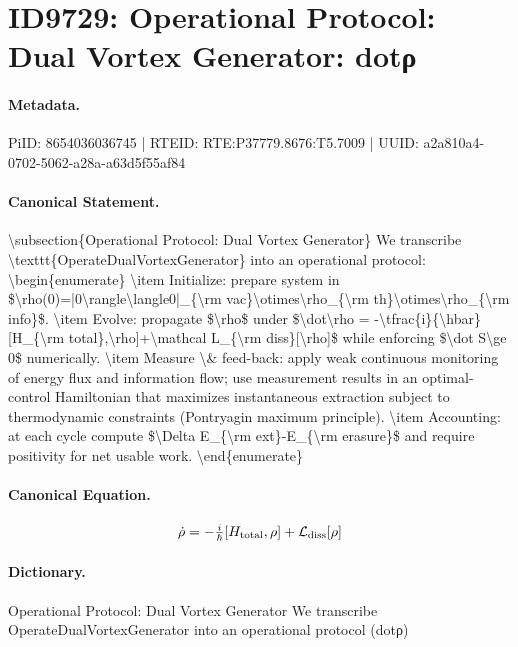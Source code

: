 \section*{ID9729: Operational Protocol: Dual Vortex Generator: dotρ}
\paragraph{Metadata.}
PiID: 8654036036745 | RTEID: RTE:P37779.8676:T5.7009 | UUID: a2a810a4-0702-5062-a28a-a63d5f55af84

\paragraph{Canonical Statement.}
\textbackslash{}subsection\{Operational Protocol: Dual Vortex Generator\} We transcribe \textbackslash{}texttt\{OperateDualVortexGenerator\} into an operational protocol: \textbackslash{}begin\{enumerate\} \textbackslash{}item Initialize: prepare system in \$\textbackslash{}rho(0)=|0\textbackslash{}rangle\textbackslash{}langle0|\_\{\textbackslash{}rm vac\}\textbackslash{}otimes\textbackslash{}rho\_\{\textbackslash{}rm th\}\textbackslash{}otimes\textbackslash{}rho\_\{\textbackslash{}rm info\}\$. \textbackslash{}item Evolve: propagate \$\textbackslash{}rho\$ under \$\textbackslash{}dot\textbackslash{}rho = -\textbackslash{}tfrac\{i\}\{\textbackslash{}hbar\}[H\_\{\textbackslash{}rm total\},\textbackslash{}rho]+\textbackslash{}mathcal L\_\{\textbackslash{}rm diss\}[\textbackslash{}rho]\$ while enforcing \$\textbackslash{}dot S\textbackslash{}ge 0\$ numerically. \textbackslash{}item Measure \textbackslash{}\& feed-back: apply weak continuous monitoring of energy flux and information flow; use measurement results in an optimal-control Hamiltonian that maximizes instantaneous extraction subject to thermodynamic constraints (Pontryagin maximum principle). \textbackslash{}item Accounting: at each cycle compute \$\textbackslash{}Delta E\_\{\textbackslash{}rm ext\}-E\_\{\textbackslash{}rm erasure\}\$ and require positivity for net usable work. \textbackslash{}end\{enumerate\}

\paragraph{Canonical Equation.}
\[
\dot\rho = -\tfrac{i}{\hbar}[H_{\rm total},\rho]+\mathcal L_{\rm diss}[\rho]
\]

\paragraph{Dictionary.}
Operational Protocol: Dual Vortex Generator We transcribe OperateDualVortexGenerator into an operational protocol (dotρ)

